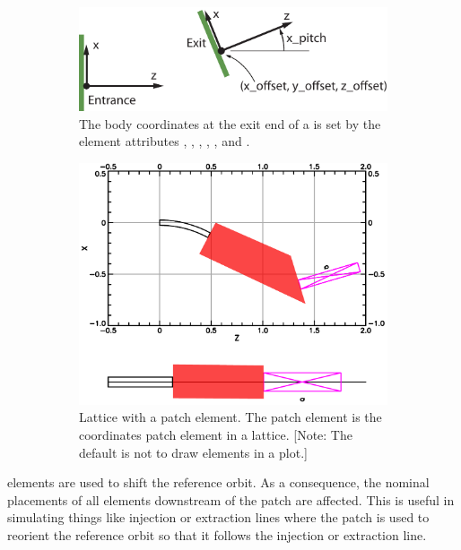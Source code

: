 \documentclass{hitec}     %
\begin{document}
{\begin{figure}[tb]
  \centering
  \begin{subfigure}[t]{0.48\textwidth}
    \includegraphics[width=\textwidth]{figures/patch.pdf}
    \vspace*{5pt}
    \caption{The body coordinates at the exit end of a  is set by the element attributes
, , , , , and .}
    \label{f:patch}
  \end{subfigure}
  \hfil
  \begin{subfigure}[t]{0.48\textwidth}
    \includegraphics[width=\textwidth]{figures/patch-example.pdf}
    \caption{Lattice with a patch element.
The patch element is the coordinates patch element in a lattice. [Note: The default is not to
draw  elements in a  plot.]}
    \label{f:patch.example}
  \end{subfigure}
  \caption{}
\end{figure}

 elements are used to shift the reference orbit. As a consequence, the nominal placements
of all elements downstream of the patch are affected. This is useful in simulating things like injection
or extraction lines where the patch is used to reorient the reference orbit so that it follows the 
injection or extraction line.

}
\end{document}
